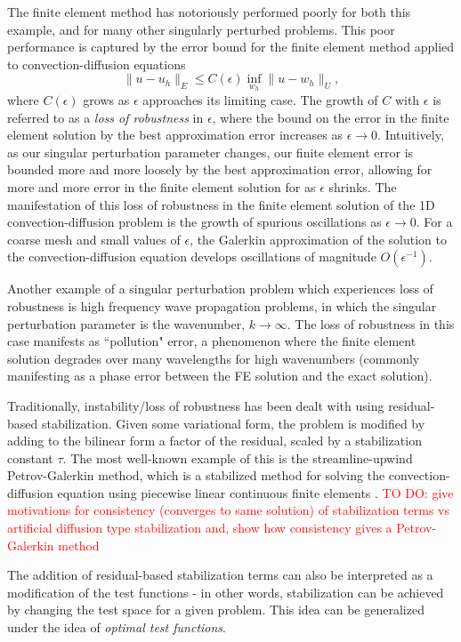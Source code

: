 \documentclass[11pt,onecolumn]{scrartcl}
\begin{document}
The finite element method has notoriously performed poorly for both this example, and for many other singularly perturbed problems. This poor performance is captured by the error bound for the finite element method applied to convection-diffusion equations
\[
\|u-u_h\|_E \leq C(\epsilon) \inf_{w_h}\|u-w_h\|_U,
\]
where $C(\epsilon)$ grows as $\epsilon$ approaches its limiting case. The growth of $C$ with $\epsilon$ is referred to as a \textit{loss of robustness} in $\epsilon$, where the bound on the error in the finite element solution by the best approximation error increases as $\epsilon\rightarrow 0$.  Intuitively, as our singular perturbation parameter changes, our finite element error is bounded more and more loosely by the best approximation error, allowing for more and more error in the finite element solution for as $\epsilon$ shrinks. The manifestation of this loss of robustness in the finite element solution of the 1D convection-diffusion problem is the growth of spurious oscillations as $\epsilon\rightarrow 0$.  For a coarse mesh and small values of $\epsilon$, the Galerkin approximation of the solution to the convection-diffusion equation develops oscillations of magnitude $O(\epsilon^{-1})$. 

Another example of a singular perturbation problem which experiences loss of robustness is high frequency wave propagation problems, in which the singular perturbation parameter is the wavenumber, $k\rightarrow \infty$. The loss of robustness in this case manifests as ``pollution" error, a phenomenon where the finite element solution degrades over many wavelengths for high wavenumbers (commonly manifesting as a phase error between the FE solution and the exact solution).  

Traditionally, instability/loss of robustness has been dealt with using residual-based stabilization.  Given some variational form, the problem is modified by adding to the bilinear form a factor of the residual, scaled by a stabilization constant $\tau$.  The most well-known example of this is the streamline-upwind Petrov-Galerkin method, which is a stabilized method for solving the convection-diffusion equation using piecewise linear continuous finite elements \cite{SUPG}.  \textcolor{red}{TO DO: give motivations for consistency (converges to same solution) of stabilization terms vs artificial diffusion type stabilization and, show how consistency gives a Petrov-Galerkin method}

The addition of residual-based stabilization terms can also be interpreted as a modification of the test functions - in other words, stabilization can be achieved by changing the test space for a given problem.  This idea can be generalized under the idea of \textit{optimal test functions}.  
\end{document}
